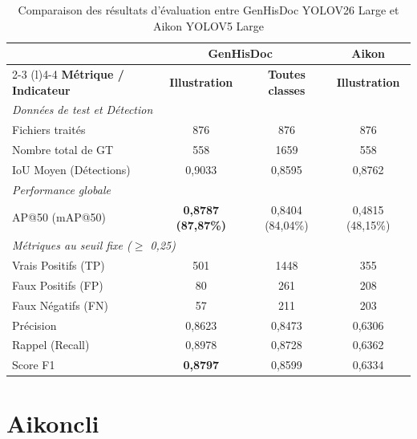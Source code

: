 \begin{table}[H]
	\centering
	\caption{Comparaison des résultats d'évaluation entre GenHisDoc YOLOV26 Large et Aikon YOLOV5 Large}
	\begin{tabular}{lccc}
		\toprule
		& \multicolumn{2}{c}{\textbf{GenHisDoc}} & \textbf{Aikon} \\
		\cmidrule(r){2-3} \cmidrule(l){4-4}
		\textbf{Métrique / Indicateur} & \textbf{Illustration} & \textbf{Toutes classes} & \textbf{Illustration} \\
		\midrule
		\multicolumn{4}{l}{\textit{Données de test et Détection}} \\
		\hspace{1em} Fichiers traités & 876 & 876 & 876 \\
		\hspace{1em} Nombre total de GT & 558 & 1659 & 558 \\
		\hspace{1em} IoU Moyen (Détections) & 0,9033 & 0,8595 & 0,8762 \\
		\midrule
		\multicolumn{4}{l}{\textit{Performance globale}} \\
		\hspace{1em} AP@50 (mAP@50) & \textbf{0,8787 (87,87\%)} & 0,8404 (84,04\%) & 0,4815 (48,15\%) \\
		\midrule
		\multicolumn{4}{l}{\textit{Métriques au seuil fixe ($\ge$ 0,25)}} \\
		\hspace{1em} Vrais Positifs (TP) & 501 & 1448 & 355 \\
		\hspace{1em} Faux Positifs (FP) & 80 & 261 & 208 \\
		\hspace{1em} Faux Négatifs (FN) & 57 & 211 & 203 \\
		\hspace{1em} Précision & 0,8623 & 0,8473 & 0,6306 \\
		\hspace{1em} Rappel (Recall) & 0,8978 & 0,8728 & 0,6362 \\
		\hspace{1em} Score F1 & \textbf{0,8797} & 0,8599 & 0,6334 \\
		\bottomrule
	\end{tabular}
\end{table}

\section{Aikoncli}

